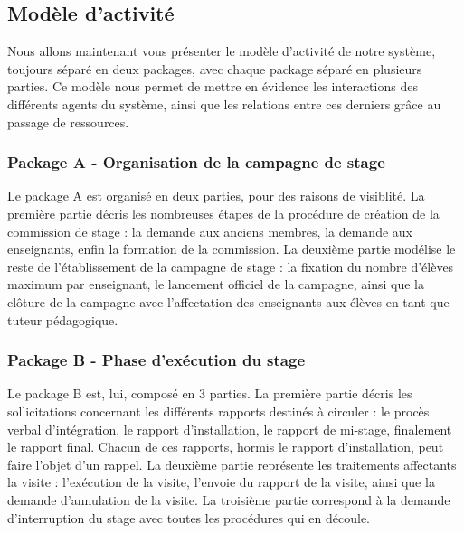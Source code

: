 \documentclass[12pt,a4paper]{article}
\begin{document}
\subsection{Modèle d'activité}

Nous allons maintenant vous présenter le modèle d'activité de notre système,
toujours séparé en deux packages, avec chaque package séparé en plusieurs
parties. Ce modèle nous permet de mettre en évidence les interactions des
différents agents du système, ainsi que les relations entre ces derniers grâce
au passage de ressources.

\subsubsection{Package A - Organisation de la campagne de stage}

Le package A est organisé en deux parties, pour des raisons de visiblité. La
première partie décris les nombreuses étapes de la procédure de création de la
commission de stage : la demande aux anciens membres, la demande aux
enseignants, enfin la formation de la commission. La deuxième partie modélise le
reste de l'établissement de la campagne de stage : la fixation du nombre
d'élèves maximum par enseignant, le lancement officiel de la campagne, ainsi que
la clôture de la campagne avec l'affectation des enseignants aux élèves en tant
que tuteur pédagogique.

\newpage {} 

\restoregeometry {} \newpage

\newpage {} 

\restoregeometry {} \newpage

\subsubsection{Package B - Phase d'exécution du stage}

Le package B est, lui, composé en 3 parties. La première partie décris les
sollicitations concernant les différents rapports destinés à circuler : le
procès verbal d'intégration, le rapport d'installation, le rapport de mi-stage,
finalement le rapport final. Chacun de ces rapports, hormis le rapport
d'installation, peut faire l'objet d'un rappel. La deuxième partie représente
les traitements affectants la visite : l'exécution de la visite, l'envoie du
rapport de la visite, ainsi que la demande d'annulation de la visite. La
troisième partie correspond à la demande d'interruption du stage avec toutes les
procédures qui en découle.
\end{document}
